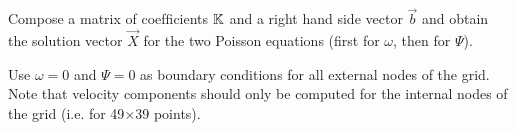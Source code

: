 Compose a matrix of coefﬁcients ${\mathbb{K}}$ and a right hand side vector $\vec{b}$ 
and obtain the solution vector $\vec{X}$ 
for the two Poisson equations (ﬁrst for $\omega$, then for $\Psi$). 


Use $\omega = 0$ and $\Psi = 0$ as boundary conditions for all 
external nodes of the grid.
Note that velocity components should only be computed for the internal 
nodes of the grid (i.e. for 49$\times$39 points).


